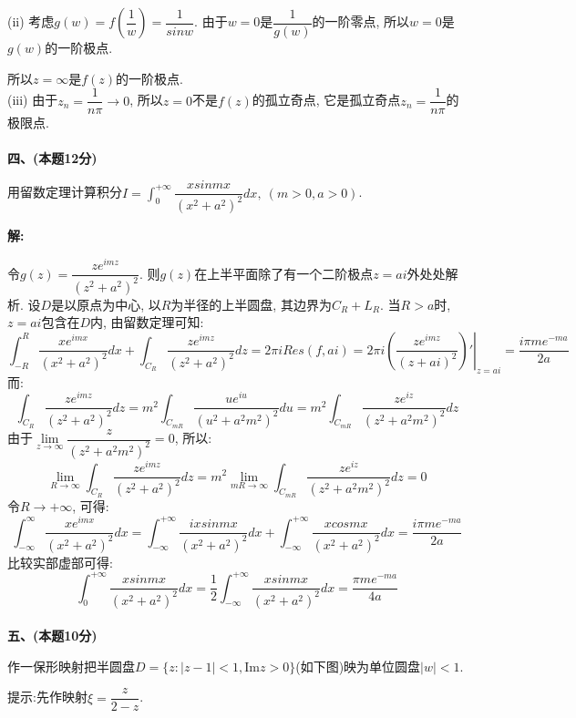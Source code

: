 \documentclass{article}
\begin{document}
(ii) 考虑$g(w) = f(\dfrac{1}{w}) = \dfrac{1}{sinw}$. 由于$w = 0$是$\dfrac{1}{g(w)}$的一阶零点, 所以$w=0$是$g(w)$的一阶极点.

\hspace{1.5em}所以$z = \infty$是$f(z)$的一阶极点.  \\


(iii) 由于$ z_n = \dfrac{1}{n\pi} \rightarrow 0$, 所以$z = 0$不是$f(z)$的孤立奇点, 它是孤立奇点$z_n = \dfrac{1}{n\pi}$的极限点. \\  \\ 



\textbf{四、(本题12分)} 

用留数定理计算积分$I = \displaystyle{\int_0^{+\infty} \dfrac{xsinmx}{(x^2+a^2)^2}dx, \ (m>0, a>0)}$. 

\textbf{解:} 

令$g(z) = \dfrac{ze^{imz}}{(z^2 + a^2)^2}$. 则$g(z)$在上半平面除了有一个二阶极点$z = ai$外处处解析. 设$D$是以原点为中心, 以$R$为半径的上半圆盘, 其边界为$C_R + L_R$. 当$R > a$时, $z = ai$包含在$D$内, 由留数定理可知:
$$ \int_{-R}^{R}\dfrac{xe^{imx}}{(x^2 + a^2)^2}dx + \int_{C_R}\dfrac{ze^{imz}}{(z^2 + a^2)^2} dz = 2\pi i Res (f, ai) = 2\pi i \left.\left( \dfrac{ze^{imz}}{(z + ai)^2} \right)'\right|_{z = ai} = \dfrac{i\pi me^{-ma}}{2a} $$
而:
$$ \int_{C_R}\dfrac{ze^{imz}}{(z^2 + a^2)^2} dz = m^2 \int_{C_{mR}} \dfrac{ue^{iu}}{(u^2 + a^2m^2)^2} du = m^2 \int_{C_{mR}} \dfrac{ze^{iz}}{(z^2 + a^2m^2)^2} dz $$
由于$\lim\limits_{z \rightarrow \infty} \dfrac{z}{(z^2+a^2m^2)^2} = 0$, 所以:
$$ \lim\limits_{R \rightarrow \infty} \int_{C_R}\dfrac{ze^{imz}}{(z^2 + a^2)^2} dz = m^2 \lim\limits_{mR \rightarrow \infty} \int_{C_{mR}} \dfrac{ze^{iz}}{(z^2 + a^2m^2)^2} dz =  0 $$
令$R \rightarrow +\infty$, 可得:
$$ \int_{-\infty}^{\infty}\dfrac{xe^{imx}}{(x^2 + a^2)^2}dx = \int_{-\infty}^{+\infty} \dfrac{ixsinmx}{(x^2+a^2)^2}dx + \int_{-\infty}^{+\infty} \dfrac{xcosmx}{(x^2+a^2)^2}dx = \dfrac{i\pi me^{-ma}}{2a} $$
比较实部虚部可得:
$$ \int_0^{+\infty} \dfrac{xsinmx}{(x^2+a^2)^2}dx = \dfrac{1}{2}\int_{-\infty}^{+\infty} \dfrac{xsinmx}{(x^2+a^2)^2}dx  = \dfrac{\pi me^{-ma}}{4a}$$ \\ 


\textbf{五、(本题10分)} 

作一保形映射把半圆盘$D = \{z: |z-1|<1, \text{Im} z >0  \}$(如下图)映为单位圆盘$|w|<1$. 
\begin{center}
\end{center}
\hspace{2em} 提示:先作映射$\xi = \dfrac{z}{2-z}$. 
\end{document}
